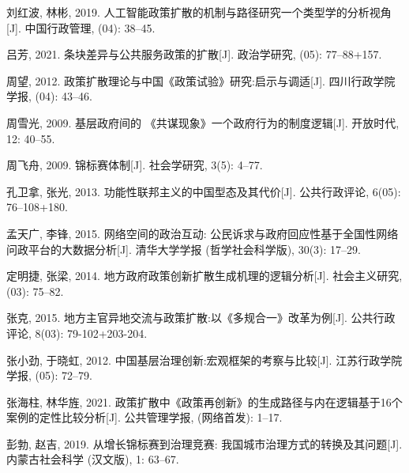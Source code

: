 \documentclass[
  12pt,
]{ctexart}
\newlength{\cslhangindent}
\newlength{\cslentryspacingunit} %
\newenvironment{CSLReferences}[2] %
 {%
  \setlength{\parindent}{0pt}
  \ifodd #1
  \let\oldpar\par
  \def\par{\hangindent=\cslhangindent\oldpar}
  \fi
  \setlength{\parskip}{#2\cslentryspacingunit}
 }%
 {}
\begin{document}
\begin{CSLReferences}{1}{0}
\leavevmode{}%
刘红波, 林彬, 2019. {人工智能政策扩散的机制与路径研究\textemdash\textemdash 一个类型学的分析视角}{[}J{]}. 中国行政管理, (04): 38--45.

\leavevmode{}%
吕芳, 2021. {条块差异与公共服务政策的扩散}{[}J{]}. 政治学研究, (05): 77--88+157.

\leavevmode{}%
周望, 2012. {政策扩散理论与中国{《政策试验》}研究:启示与调适}{[}J{]}. 四川行政学院学报, (04): 43--46.

\leavevmode{}%
周雪光, 2009. 基层政府间的 {《共谋现象》}\textemdash\textemdash 一个政府行为的制度逻辑{[}J{]}. 开放时代, 12: 40--55.

\leavevmode{}%
周飞舟, 2009. 锦标赛体制{[}J{]}. 社会学研究, 3(5): 4--77.

\leavevmode{}%
孔卫拿, 张光, 2013. {功能性联邦主义的中国型态及其代价}{[}J{]}. 公共行政评论, 6(05): 76--108+180.

\leavevmode{}%
孟天广, 李锋, 2015. 网络空间的政治互动: 公民诉求与政府回应性\textemdash\textemdash 基于全国性网络问政平台的大数据分析{[}J{]}. 清华大学学报 (哲学社会科学版), 30(3): 17--29.

\leavevmode{}%
定明捷, 张梁, 2014. {地方政府政策创新扩散生成机理的逻辑分析}{[}J{]}. 社会主义研究, (03): 75--82.

\leavevmode{}%
张克, 2015. {地方主官异地交流与政策扩散:以{《多规合一》}改革为例}{[}J{]}. 公共行政评论, 8(03): 79-102+203-204.

\leavevmode{}%
张小劲, 于晓虹, 2012. {中国基层治理创新:宏观框架的考察与比较}{[}J{]}. 江苏行政学院学报, (05): 72--79.

\leavevmode{}%
张海柱, 林华旌, 2021. {政策扩散中{《政策再创新》}的生成路径与内在逻辑\textemdash\textemdash 基于16个案例的定性比较分析}{[}J{]}. 公共管理学报, (网络首发): 1--17.

\leavevmode{}%
彭勃, 赵吉, 2019. 从增长锦标赛到治理竞赛: 我国城市治理方式的转换及其问题{[}J{]}. 内蒙古社会科学 (汉文版), 1: 63--67.


\end{CSLReferences}
\end{document}
